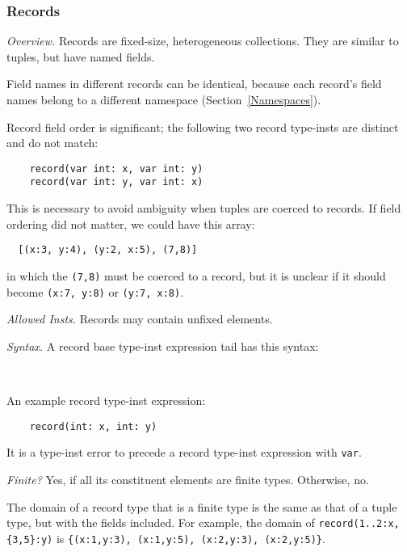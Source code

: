 \documentclass[10pt]{scrartcl}
\newcommand{\TyThing}[1]{\vspace{1.2mm}\noindent\emph{#1} }
\newcommand{\TyOverview}{\TyThing{Overview.}}
\newcommand{\TyInsts}{\TyThing{Allowed Insts.}}
\newcommand{\TySyntax}{\TyThing{Syntax.}}
\newcommand{\TyFiniteType}{\TyThing{Finite?}}
\begin{document}
{%
\subsubsection{Records}
        \label{Records}
\TyOverview
Records are fixed-size, heterogeneous collections.  They are similar to
tuples, but have named fields.

Field names in different records can be identical, because each record's
field names belong to a different namespace (Section~\ref{Namespaces}).

Record field order is significant;  the following two record type-insts are
distinct and do not match:
\begin{verbatim}
    record(var int: x, var int: y)
    record(var int: y, var int: x)
\end{verbatim}

\begin{RationaleEnv}
This is necessary to avoid ambiguity when tuples are coerced to records.
If field ordering did not matter, we could have this array:
\begin{small}
\begin{verbatim}
  [(x:3, y:4), (y:2, x:5), (7,8)]
\end{verbatim}
\end{small}
in which the \texttt{(7,8)} must be coerced to a record, but it is unclear
if it should become \texttt{(x:7, y:8)} or \texttt{(y:7, x:8)}.
\end{RationaleEnv}

\TyInsts
Records may contain unfixed elements.

\TySyntax
A record base type-inst expression tail has this syntax:
\begin{productions}
    \RuleRecordTIExprTail \\
    \RuleTIExprAndId
\end{productions}
An example record type-inst expression:
\begin{verbatim}
    record(int: x, int: y)
\end{verbatim}
It is a type-inst error to precede a record type-inst expression with
\texttt{var}.

\TyFiniteType
Yes, if all its constituent elements are finite types.  Otherwise, no.

The domain of a record type that is a finite type is the same as that of a
tuple type, but with the fields included.  For example, the domain of
\texttt{record(1..2:x, \{3,5\}:y)} is
\verb+{(x:1,y:3), (x:1,y:5), (x:2,y:3), (x:2,y:5)}+.

}
\end{document}
